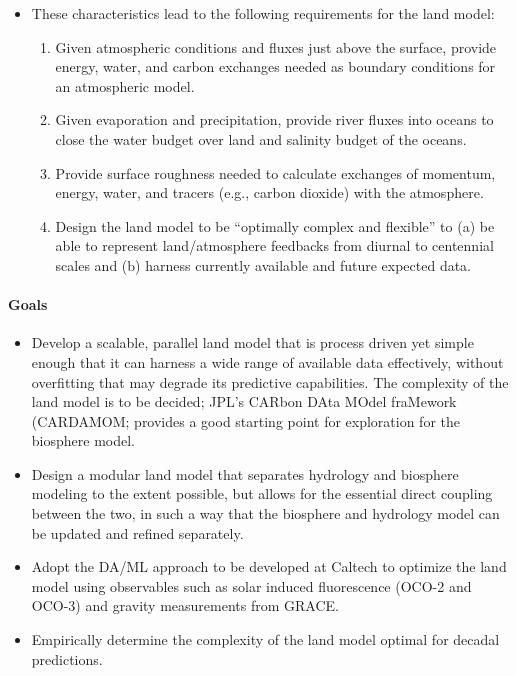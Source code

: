 \documentclass{article}
\begin{document}
\begin{itemize}
    \item These characteristics lead to the following requirements for the land model:
    \begin{enumerate}
        \item Given atmospheric conditions and fluxes just above the surface, provide energy, water, and carbon exchanges needed as boundary conditions for an atmospheric model.
        \item Given evaporation and precipitation, provide river fluxes into oceans to close the water budget over land and salinity budget of the oceans. 
        \item Provide surface roughness needed to calculate exchanges of momentum, energy, water, and tracers (e.g., carbon dioxide) with the atmosphere.
        \item Design the land model to be ``optimally complex and flexible'' to (a) be able to represent land/atmosphere feedbacks from diurnal to centennial scales and (b) harness currently available and future expected data.
    \end{enumerate}
\end{itemize}

\paragraph{Goals}
\begin{itemize}
\item Develop a scalable, parallel land model that is process driven yet simple enough that it can harness a wide range of available data effectively, without overfitting that may degrade its predictive capabilities. The complexity of the land model is to be decided; JPL's CARbon DAta MOdel fraMework (CARDAMOM; \citet{Bloom16a} provides a good starting point for exploration for the biosphere model. 
\item Design a modular land model that separates hydrology and biosphere modeling to the extent possible, but allows for the essential direct coupling between the two, in such a way that the biosphere and hydrology model can be updated and refined separately. 
\item Adopt the DA/ML approach to be developed at Caltech to optimize the land model using observables such as solar induced fluorescence (OCO-2 and OCO-3) and gravity measurements from GRACE.
\item Empirically determine the complexity of the land model optimal for decadal predictions.
\end{itemize}
\end{document}
